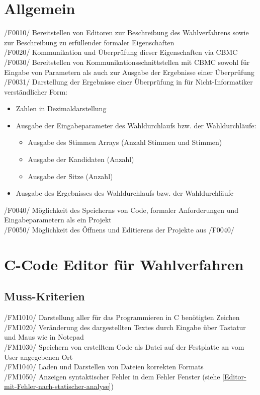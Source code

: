 \documentclass[a4paper]{scrreprt}
\begin{document}
\section{Allgemein}
/F0010/ Bereitstellen von Editoren zur Beschreibung des Wahlverfahrens sowie zur Beschreibung zu erfüllender formaler Eigenschaften \\
/F0020/ Kommunikation und Überprüfung dieser Eigenschaften via \ac{CBMC} \\
/F0030/ Bereitstellen von Kommunikationsschnittstellen mit \ac{CBMC} sowohl für Eingabe von Parametern als auch zur Ausgabe der Ergebnisse einer Überprüfung \\
/F0031/ Darstellung der Ergebnisse einer Überprüfung in für Nicht-Informatiker verständlicher Form:
\begin{itemize}
\item Zahlen in Dezimaldarstellung
\item Ausgabe der Eingabeparameter des Wahldurchlaufs bzw. der Wahldurchläufe:
\begin{itemize}
\item Ausgabe des Stimmen Arrays (Anzahl Stimmen und Stimmen) 
\item Ausgabe der Kandidaten (Anzahl)
\item Ausgabe der Sitze (Anzahl)
\end{itemize}
\item Ausgabe des Ergebnisses des Wahldurchlaufs bzw. der Wahldurchläufe
\end{itemize} 
/F0040/ Möglichkeit des Speicherns von Code, formaler Anforderungen und Eingabeparametern als ein Projekt \\
/F0050/ Möglichkeit des Öffnens und Editierens der Projekte aus /F0040/

\section{C-Code Editor für Wahlverfahren}
\subsection{Muss-Kriterien}
/FM1010/ Darstellung aller für das Programmieren in C benötigten Zeichen \\
/FM1020/ Veränderung des dargestellten Textes durch Eingabe über Tastatur und Maus wie in Notepad \\
/FM1030/ Speichern von erstelltem Code als Datei auf der Festplatte an vom User angegebenen Ort \\
/FM1040/ Laden und Darstellen von Dateien korrekten Formats \\
/FM1050/ Anzeigen syntaktischer Fehler in dem Fehler Fenster (siehe \ref{Editor-mit-Fehler-nach-statischer-analyse})
\end{document}

